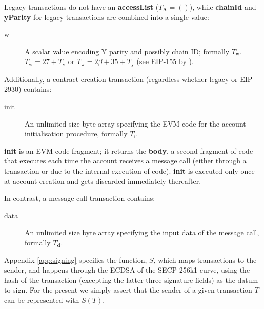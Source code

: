 \documentclass[9pt,oneside]{amsart}
\makeatletter
\newcommand{\linkdest}[1]{\Hy@raisedlink{\hypertarget{#1}{}}}
\makeatother
\begin{document}
\begin{multicols}{2}
Legacy transactions do not have an \textbf{accessList} ($T_{\mathbf{A}}=()$), while \textbf{chainId} and \textbf{yParity} for legacy transactions are combined into a single value:
\begin{description}
\item[w]\linkdest{T__w}{} A scalar value encoding Y parity and possibly chain ID; formally $T_{\mathrm{w}}$.
$T_{\mathrm{w}} = 27 + T_{\mathrm{y}}$ or $T_{\mathrm{w}} = 2\beta + 35 + T_{\mathrm{y}}$ (see EIP-155 by \cite{EIP-155}).
\end{description}

Additionally, a contract creation transaction (regardless whether legacy or EIP-2930) contains:

\begin{description}
\item[init] An unlimited size byte array specifying the EVM-code for the account initialisation procedure, formally $T_{\mathbf{i}}$.
\end{description}

\textbf{init} is an EVM-code fragment; it returns the \textbf{body}, a second fragment of code that executes each time the account receives a message call (either through a transaction or due to the internal execution of code). \textbf{init} is executed only once at account creation and gets discarded immediately thereafter.

In contrast, a message call transaction contains:

\begin{description}
\item[data] An unlimited size byte array specifying the input data of the message call, formally $T_{\mathbf{d}}$.
\end{description}

Appendix \ref{app:signing} specifies the function, $S$, which maps transactions to the sender, and happens through the ECDSA of the SECP-256k1 curve, using the hash of the transaction (excepting the latter three signature fields) as the datum to sign. For the present we simply assert that the sender of a given transaction $T$ can be represented with $S(T)$.


\end{multicols}
\end{document}
